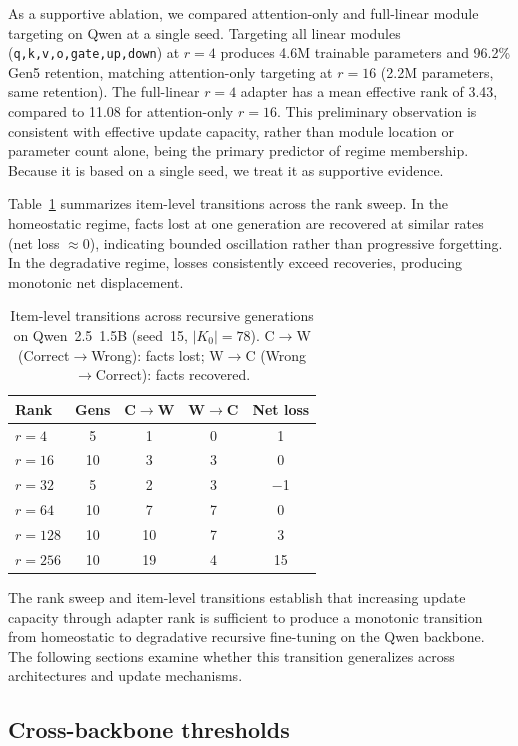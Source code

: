 \documentclass[a4paper,fleqn]{cas-dc}
\newif\ifshowchanges
\newcommand{\rev}[1]{\ifshowchanges{\color{blue}#1}\else{#1}\fi}
\renewcommand{\arraystretch}{1.8}
\begin{document}
As a supportive ablation, we compared attention-only and full-linear module
targeting on Qwen at a single seed. Targeting all linear modules
(\texttt{q,k,v,o,gate,up,down}) at $r=4$ produces 4.6M trainable parameters and
96.2\% Gen5 retention, matching attention-only targeting at $r=16$ (2.2M
parameters, same retention). The full-linear $r=4$ adapter has a mean effective
rank of 3.43, compared to 11.08 for attention-only $r=16$. This preliminary
observation is consistent with effective update capacity, rather than module
location or parameter count alone, being the primary predictor of regime
membership. Because it is based on a single seed, we treat it as supportive
evidence.

Table~\ref{tab:transitions} summarizes item-level transitions across the rank
sweep. In the homeostatic regime, facts lost at one generation are recovered at
similar rates (net loss $\approx 0$), indicating bounded oscillation rather than
progressive forgetting. In the degradative regime, losses consistently exceed
recoveries, producing monotonic net displacement.

\begin{table}[tp]
\caption{Item-level transitions across recursive generations on
Qwen~2.5~1.5B (seed~15, $\rev{|K_0| = 78}$). C$\to$W (Correct$\to$Wrong): facts lost;
W$\to$C (Wrong$\to$Correct): facts recovered.}\label{tab:transitions}
\footnotesize
\renewcommand{\arraystretch}{1.4}
\begin{tabular}{@{}lcccc@{}}
\toprule
Rank & Gens & C$\to$W & W$\to$C & Net loss \\
\midrule
$r=4$   & 5  & 1  & 0 & 1 \\
$r=16$  & 10 & 3  & 3 & 0 \\
$r=32$  & 5  & 2  & 3 & $-$1 \\
$r=64$  & 10 & 7  & 7 & 0 \\
$r=128$ & 10 & 10 & 7 & 3 \\
$r=256$ & 10 & 19 & 4 & 15 \\
\bottomrule
\end{tabular}
\end{table}

The rank sweep and item-level transitions establish that increasing update
capacity through adapter rank is sufficient to produce a monotonic transition
from homeostatic to degradative recursive fine-tuning on the Qwen backbone. The
following sections examine whether this transition generalizes across
architectures and update mechanisms.

\subsection{Cross-backbone thresholds}\label{sec:res_backbone}
\end{document}
